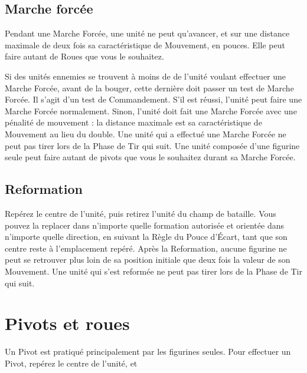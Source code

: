 \subsection{Marche forcée}

Pendant une Marche Forcée, une unité ne peut qu'avancer, et sur une distance maximale de deux fois sa caractéristique de Mouvement, en pouces. Elle peut faire autant de Roues que vous le souhaitez.

Si des unités ennemies se trouvent à moins de  de l'unité voulant effectuer une Marche Forcée, avant de la bouger, cette dernière doit passer un test de Marche Forcée. Il s'agit d'un test de Commandement. S'il est réussi, l'unité peut faire une Marche Forcée normalement. Sinon, l'unité doit fait une Marche Forcée avec une pénalité de mouvement : la distance maximale est sa caractéristique de Mouvement au lieu du double. Une unité qui a effectué une Marche Forcée ne peut pas tirer lors de la Phase de Tir qui suit. Une unité composée d'une figurine seule peut faire autant de pivots que vous le souhaitez durant sa Marche Forcée.

\subsection{Reformation}

Repérez le centre de l'unité, puis retirez l'unité du champ de bataille. Vous pouvez la replacer dans n'importe quelle formation autorisée et orientée dans n'importe quelle direction, en suivant la Règle du Pouce d'Écart, tant que son centre reste à l'emplacement repéré. Après la Reformation, aucune figurine ne peut se retrouver plus loin de sa position initiale que deux fois la valeur de son Mouvement. Une unité qui s'est reformée ne peut pas tirer lors de la Phase de Tir qui suit.

\newpage
\section{Pivots et roues}

Un Pivot est pratiqué principalement par les figurines seules. Pour effectuer un Pivot, repérez le centre de l'unité, et 

